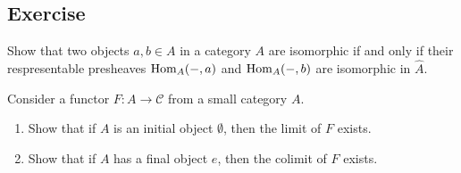 \subsection{Exercise}

\begin{Exercise}
    Show that two objects $ a , b \in A $ in a category $ A $ are isomorphic if and only if their respresentable presheaves $ \operatorname{Hom}_A ( - , a ) $ and $ \operatorname{Hom}_A ( -, b ) $ are isomorphic in $ \widehat{ A } $.
\end{Exercise}

\begin{Exercise}
    Consider a functor $ F \colon A  \to \mathcal{ C } $ from a small category $A$.
    
    \begin{enumerate}
        \item 
        Show that if $ A $ is an initial object $ \emptyset $, then the limit of $ F $ exists.
    
        \item 
        Show that if $ A $ has a final object $ e $, then the colimit of $ F $ exists.
    \end{enumerate}
\end{Exercise}

